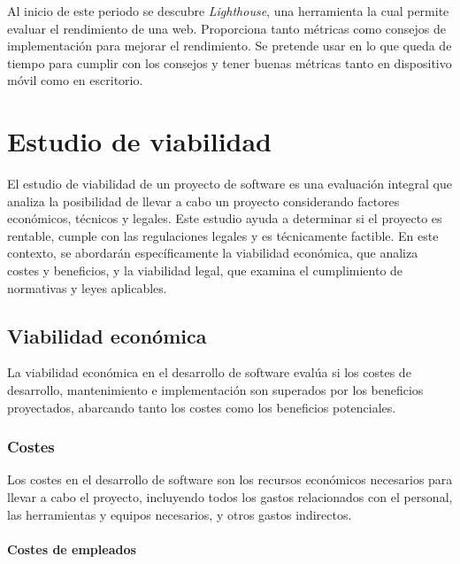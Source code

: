 Al inicio de este periodo se descubre \textit{Lighthouse}, una herramienta la cual permite evaluar el rendimiento de una web. Proporciona tanto métricas como consejos de implementación para mejorar el rendimiento. Se pretende usar en lo que queda de tiempo para cumplir con los consejos y tener buenas métricas tanto en dispositivo móvil como en escritorio.


\section{Estudio de viabilidad}
El estudio de viabilidad de un proyecto de software es una evaluación integral que analiza la posibilidad de llevar a cabo un proyecto considerando factores económicos, técnicos y legales. Este estudio ayuda a determinar si el proyecto es rentable, cumple con las regulaciones legales y es técnicamente factible. En este contexto, se abordarán específicamente la viabilidad económica, que analiza costes y beneficios, y la viabilidad legal, que examina el cumplimiento de normativas y leyes aplicables.

\subsection{Viabilidad económica}
La viabilidad económica en el desarrollo de software evalúa si los costes de desarrollo, mantenimiento e implementación son superados por los beneficios proyectados, abarcando tanto los costes como los beneficios potenciales.

\subsubsection{Costes}
Los costes en el desarrollo de software son los recursos económicos necesarios para llevar a cabo el proyecto, incluyendo todos los gastos relacionados con el personal, las herramientas y equipos necesarios, y otros gastos indirectos.

\paragraph{Costes de empleados}

